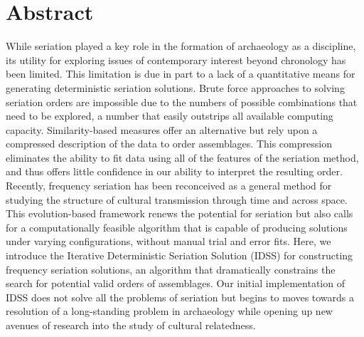 \documentclass[10pt,letterpaper]{article}
\begin{document}
\section*{Abstract}
While seriation played a key role in the formation of archaeology as a discipline, its utility for exploring issues of contemporary interest beyond chronology has been limited. This limitation is due in part to a lack of a quantitative means for generating deterministic seriation solutions. Brute force approaches to solving seriation orders are impossible due to the numbers of possible combinations that need to be explored, a number that easily outstrips all available computing capacity. Similarity-based measures offer an alternative but rely upon a compressed description of the data to order assemblages. This compression eliminates the ability to fit data using all of the features of the seriation method, and thus offers little confidence in our ability to interpret the resulting order. Recently, frequency seriation has been reconceived as a general method for studying the structure of cultural transmission through time and across space. This evolution-based framework renews the potential for seriation but also calls for a computationally feasible algorithm that is capable of producing solutions under varying configurations, without manual trial and error fits. Here, we introduce the Iterative Deterministic Seriation Solution (IDSS) for constructing frequency seriation solutions, an algorithm that dramatically constrains the search for potential valid orders of assemblages. Our initial implementation of IDSS does not solve all the problems of seriation but begins to moves towards a resolution of a long-standing problem in archaeology while opening up new avenues of research into the study of cultural relatedness.


\end{document}
